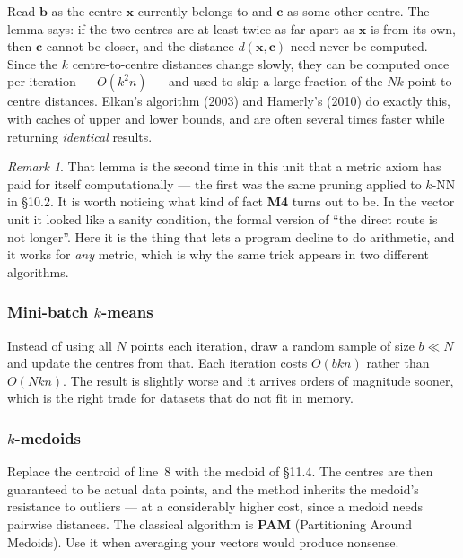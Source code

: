 \documentclass[11pt]{article}
\theoremstyle{plain}
\theoremstyle{definition}
\theoremstyle{remark}
\newtheorem*{rmk}{Remark}
\newcommand{\vc}[1]{\mathbf{#1}}
\begin{document}
\noindent Read $\vc{b}$ as the centre $\vc{x}$ currently belongs to and
$\vc{c}$ as some other centre. The lemma says: if the two centres are at least
twice as far apart as $\vc{x}$ is from its own, then $\vc{c}$ cannot be closer,
and the distance $d(\vc{x},\vc{c})$ need never be computed. Since the $k$
centre-to-centre distances change slowly, they can be computed once per
iteration --- $O(k^{2}n)$ --- and used to skip a large fraction of the $Nk$
point-to-centre distances. Elkan's algorithm (2003) and Hamerly's (2010) do
exactly this, with caches of upper and lower bounds, and are often several times
faster while returning \emph{identical} results.

\begin{rmk}
That lemma is the second time in this unit that a metric axiom has paid for
itself computationally --- the first was the same pruning applied to $k$-NN in
\S10.2. It is worth noticing what kind of fact \textbf{M4} turns out to be. In
the vector unit it looked like a sanity condition, the formal version of ``the
direct route is not longer''. Here it is the thing that lets a program decline
to do arithmetic, and it works for \emph{any} metric, which is why the same
trick appears in two different algorithms.
\end{rmk}

\subsubsection*{Mini-batch $k$-means}
Instead of using all $N$ points each iteration, draw a random sample of size $b
\ll N$ and update the centres from that. Each iteration costs $O(bkn)$ rather
than $O(Nkn)$. The result is slightly worse and it arrives orders of magnitude
sooner, which is the right trade for datasets that do not fit in memory.

\subsubsection*{$k$-medoids}
Replace the centroid of line~8 with the medoid of \S11.4. The centres are then
guaranteed to be actual data points, and the method inherits the medoid's
resistance to outliers --- at a considerably higher cost, since a medoid needs
pairwise distances. The classical algorithm is \textbf{PAM} (Partitioning Around
Medoids). Use it when averaging your vectors would produce nonsense.

\end{document}
